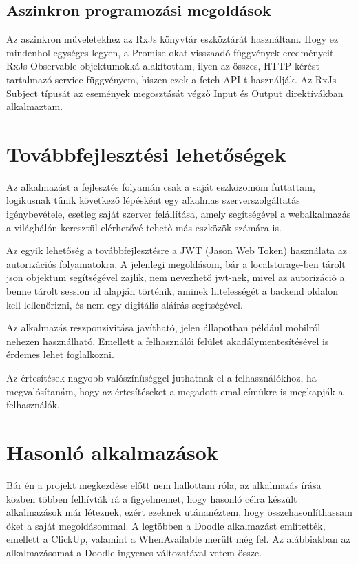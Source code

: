 \documentclass[a4paper,12pt]{report}
\theoremstyle{definition}
\theoremstyle{remark}
\begin{document}
\section{Aszinkron programozási megoldások}

Az aszinkron műveletekhez az RxJs könyvtár eszköztárát használtam. Hogy ez mindenhol egységes legyen, a Promise-okat visszaadó függvények eredményeit RxJs Observable objektumokká alakítottam, ilyen az összes, HTTP kérést tartalmazó service függvényem, hiszen ezek a fetch API-t használják. Az RxJs Subject típusát az események megosztását végző Input és Output direktívákban alkalmaztam.
 
\chapter{Továbbfejlesztési lehetőségek}

Az alkalmazást a fejlesztés folyamán csak a saját eszközömöm futtattam, logikusnak tűnik következő lépésként egy alkalmas szerverszolgáltatás igénybevétele, esetleg saját szerver felállítása, amely segítségével a webalkalmazás a világhálón keresztül elérhetővé tehető más eszközök számára is.

Az egyik lehetőség a továbbfejlesztésre a JWT\cite{JWTwebsite} (Jason Web Token) használata az autorizációs folyamatokra. A jelenlegi megoldásom, bár a localstorage-ben tárolt json objektum segítségével zajlik, nem nevezhető jwt-nek, mivel az autorizáció a benne tárolt session id alapján történik, aminek hitelességét a backend oldalon kell lellenőrizni, és nem egy digitális aláírás segítségével.

Az alkalmazás reszponzivitása javítható, jelen állapotban például mobilról nehezen használható. Emellett a felhasználói felület akadálymentesítésével is érdemes lehet foglalkozni.

Az értesítések nagyobb valószínűséggel juthatnak el a felhasználókhoz, ha megvalósítanám, hogy az értesítéseket a megadott emal-címükre is megkapják a felhasználók.

\chapter{Hasonló alkalmazások}

Bár én a projekt megkezdése előtt nem hallottam róla, az alkalmazás írása közben többen felhívták rá a figyelmemet, hogy hasonló célra készült alkalmazások már léteznek, ezért ezeknek utánanéztem, hogy összehasonlíthassam őket a saját megoldásommal. A legtöbben a Doodle alkalmazást említették, emellett a ClickUp, valamint a WhenAvailable merült még fel. Az alábbiakban az alkalmazásomat a Doodle\cite{DoodleWebsite} ingyenes változatával vetem össze.
\end{document}
